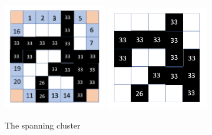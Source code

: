 \documentclass[12pt]{article}
\begin{document}
\begin{figure}[h]
\centering
\includegraphics[width=0.4\textwidth]{Spanning1}
\includegraphics[width=0.4\textwidth]{Spanning2}
\caption{The spanning cluster}
\label{Spanning}
\end{figure}
\end{document}
